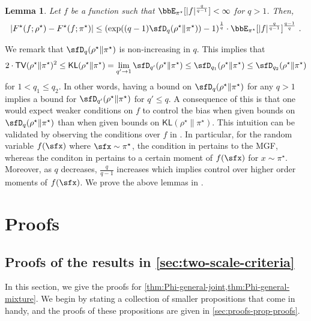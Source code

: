 \documentclass[11pt]{article}
\newtheorem{lemma}{Lemma}[section]
\newcounter{ct}
\begin{document}
\begin{lemma}
\label{lem:renyi-moment}
Let \(f\) be a function such that \(\bbE_{\pi^{\star}}[|f|^{\frac{q}{q - 1}}] < \infty\) for \(q > 1\).
Then,
\begin{equation*}
    \left|F^{\star}(f; \rho^{\star}) - F^{\star}(f; \pi^{\star})\right| \leq \left(\exp((q - 1) \sfD_{q}(\rho^{\star} \| \pi^{\star})) - 1\right)^{\frac{1}{q}} \cdot \bbE_{\pi^{\star}}[|f|^{\frac{q}{q - 1}}]^{\frac{q - 1}{q}}~.
\end{equation*}
\end{lemma}

We remark that \(\sfD_{q}(\rho^{\star} \| \pi^{\star})\) is non-increasing in \(q\).
This implies that
\begin{equation*}
    2 \cdot \mathsf{TV}(\rho^{\star} \| \pi^{\star})^{2} \leq  \mathsf{KL}(\rho^{\star} \| \pi^{\star}) = \lim_{q' \to 1} \sfD_{q'}(\rho^{\star} \| \pi^{\star}) \leq \sfD_{q_{1}}(\rho^{\star} \| \pi^{\star}) \leq \sfD_{q_{2}}(\rho^{\star} \| \pi^{\star})
\end{equation*}
for \(1 < q_{1} \leq q_{2}\).
In other words, having a bound on \(\sfD_{q}(\rho^{\star} \| \pi^{\star})\) for any \(q > 1\) implies a bound for \(\sfD_{q'}(\rho^{\star} \| \pi^{\star})\) for \(q' \leq q\).
A consequence of this is that one would expect weaker conditions on \(f\) to control the bias when given bounds on \(\sfD_{q}(\rho^{\star} \| \pi^{\star})\) than when given bounds on \(\mathsf{KL}(\rho^{\star} \| \pi^{\star})\).
This intuition can be validated by observing the conditions over \(f\) in .
In particular, for the random variable \(f(\sfx)\) where \(\sfx \sim \pi^{\star}\), the condition in  pertains to the MGF, whereas the conditon in  pertains to a certain moment of \(f(\sfx)\) for \(x \sim \pi^{\star}\).
Moreover, as \(q\) decreases, \(\frac{q}{q - 1}\) increases which implies control over higher order moments of \(f(\sfx)\).
We prove the above lemmas in .
\section{Proofs}
\label{sec:proofs}

\subsection{Proofs of the results in \cref{sec:two-scale-criteria}}

In this section, we give the proofs for \cref{thm:Phi-general-joint,thm:Phi-general-mixture}.
We begin by stating a collection of smaller propositions that come in handy, and the proofs of these propositions are given in \cref{sec:proofs-prop-proofs}.
\end{document}
